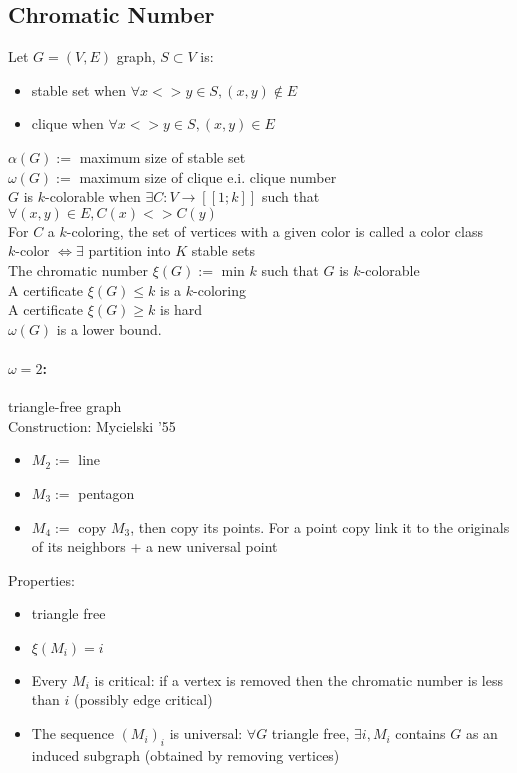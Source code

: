 \documentclass[12pt]{article}
\begin{document}
\subsection{Chromatic Number}
Let $G=(V,E)$ graph, $S \subset V$ is:
\begin{itemize}
\item stable set when $\forall x <> y \in S, (x,y) \notin E$
\item clique when $\forall x <> y \in S, (x,y) \in E$
\end{itemize}
$\alpha(G) :=$ maximum size of stable set\\
$\omega(G) :=$ maximum size of clique e.i. clique number\\
$G$ is $k$-colorable when $\exists C : V \rightarrow [[1;k]]$ such that $\forall (x,y) \in E, C(x) <> C(y)$\\
For $C$ a $k$-coloring, the set of vertices with a given color is called a color class\\
$k$-color $\Leftrightarrow \exists$ partition into $K$ stable sets\\
The chromatic number $\xi(G) :=$ min $k$ such that $G$ is $k$-colorable\\
A certificate $\xi(G) \leqslant k$ is a $k$-coloring\\
A certificate $\xi(G) \geqslant k$ is hard\\
$\omega(G)$ is a lower bound.

\paragraph{$\omega = 2$:} triangle-free graph\\
Construction: Mycielski '55\\
\begin{itemize}
\item $M_2 :=$ line
\item $M_3 :=$ pentagon
\item $M_4 :=$ copy $M_3$, then copy its points. For a point copy link it to the originals of its neighbors + a new universal point
\end{itemize}
Properties:
\begin{itemize}
\item triangle free
\item $\xi (M_i) = i$
\item Every $M_i$ is critical: if a vertex is removed then the chromatic number is less than $i$ (possibly edge critical)
\item The sequence $(M_i)_i$  is universal: $\forall G$ triangle free, $\exists i, M_i$ contains $G$ as an induced subgraph (obtained by removing vertices)
\end{itemize}
\end{document}
